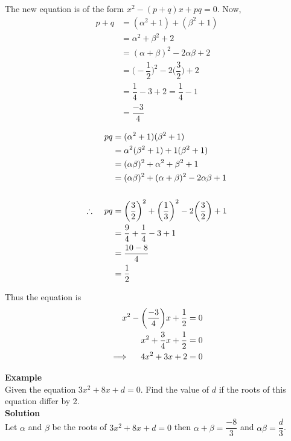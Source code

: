 \documentclass[11pt,a4paper]{article}
\begin{document}
The new equation is of the form  \hspace{0.2cm}$x^2-(p+q)x+pq=0$.\hspace{0.2cm}
Now,
\begin{align*}
p+q & =(\alpha^2+1)+(\beta^2+1)\\
    & = \alpha^2+\beta^2+2\\
    & = (\alpha +\beta)^2-2\alpha \beta +2\\
    & = \bigg(-\dfrac{1}{2}\bigg)^2-2\bigg(\dfrac{3}{2}\bigg)+2\\
    & = \dfrac{1}{4}-3+2=\dfrac{1}{4}-1\\
    & = \dfrac{-3}{4}
\end{align*}


\begin{align*}
pq & =(\alpha^2+1)(\beta^2+1)\\
   & = \alpha^2(\beta^2+1)+1(\beta^2+1)\\
   & = (\alpha \beta)^2+\alpha^2+\beta^2+1\\
   & = (\alpha \beta)^2+(\alpha+\beta)^2-2\alpha \beta +1\\\\
\therefore \hspace{0.4cm} pq & = \bigg(\frac{3}{2}\bigg)^2+\bigg(\frac{1}{3}\bigg)^2-2\bigg(\frac{3}{2}\bigg)+1\\
                             & = \frac{9}{4}+\frac{1}{4}-3+1\\
                             & = \frac{10-8}{4}\\
                             & = \frac{1}{2}\\
\end{align*}


Thus the equation is
\begin{align*}
x^2-\bigg(\dfrac{-3}{4}\bigg)x+\dfrac{1}{2} & = 0\\
x^2+\dfrac{3}{4}x+\frac{1}{2} & = 0\\
\implies \hspace{0.4cm} 4x^2+3x+2 & =0\\
\end{align*}




\textbf{Example}\\
Given the equation $3x^2+8x+d=0$. Find the value of $d$ if the roots of this equation differ by 2.\\

\textbf{Solution}\\
Let $\alpha$ and $\beta$ be the roots of $3x^2+8x+d=0$ then $\alpha +\beta =\dfrac{-8}{3}$ and $\alpha \beta =\dfrac{d}{3}$.\\
\end{document}
